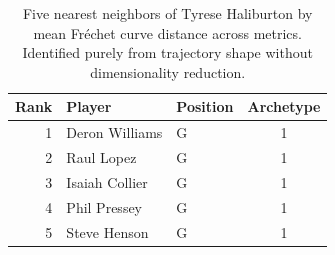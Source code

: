 \begin{table}[htbp]
  \centering\small
  \begin{tabular}{rllc}
    \toprule
    Rank & Player & Position & Archetype \\
    \midrule
    1 & Deron Williams & G & 1 \\
    2 & Raul Lopez & G & 1 \\
    3 & Isaiah Collier & G & 1 \\
    4 & Phil Pressey & G & 1 \\
    5 & Steve Henson & G & 1 \\
    \bottomrule
  \end{tabular}
  \caption{Five nearest neighbors of Tyrese Haliburton by mean Fr\'{e}chet curve distance across metrics. Identified purely from trajectory shape without dimensionality reduction.}
  \label{tab:Tyrese_Haliburton_frechet_curve_neighbors}
\end{table}

